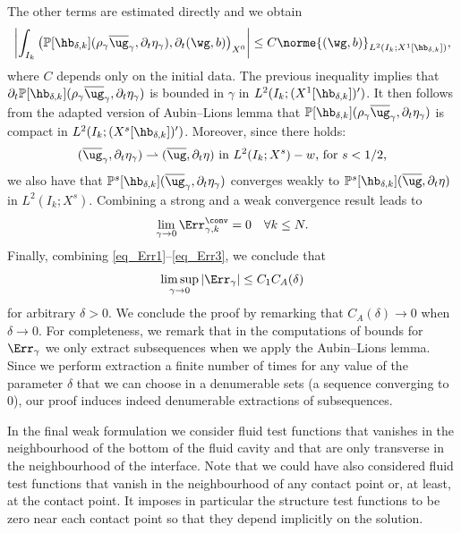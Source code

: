 The other terms are estimated directly and we obtain
\[
\left\vert \int_{I_{k}}\left( \mathbb{P}[\hb_{\delta, k}](\rho_{\gamma}\overline{\ug}_{\gamma},\partial_{t}\eta_{\gamma}), \partial_{t}(\wg,b) \right)_{X^0}\right\vert \leq C\norme{(\wg,b)}_{L^{2}(I_{k};X^{1}[\hb_{\delta, k}])},
\]
where $C$ depends only on the initial data.
The previous inequality implies that $\partial_{t}\mathbb{P}[\hb_{\delta, k}](\rho_{\gamma}\overline{\ug}_{\gamma},\partial_{t}\eta_{\gamma})$ is bounded in $\gamma$ in $L^{2}(I_{k};(X^{1}[\hb_{\delta, k}])')$. It then follows from the adapted version of Aubin--Lions lemma that $\mathbb{P}[\hb_{\delta, k}](\rho_{\gamma}\overline{\ug}_{\gamma},\partial_{t}\eta_{\gamma})$ is compact in $L^{2}(I_{k};(X^{s}[\hb_{\delta, k}])')$. Moreover, since there holds:
\[
(\overline{\ug}_{\gamma},\partial_t \eta_{\gamma}) \rightharpoonup (\overline{\ug},\partial_t \eta) \text{ in $L^2(I_k; X^s)-w$, for $s<1/2$,}
\]
we also have that
$\mathbb P^s[\hb_{\delta,k}](\overline{\ug}_{\gamma},\partial_t \eta_{\gamma})$ converges weakly to $\mathbb P^s[\hb_{\delta,k}](\overline{\ug},\partial_t \eta)$ in $L^2(I_k;X^s)$. Combining a strong and a weak convergence result leads to
\begin{equation} \label{eq_Err3}
\lim_{\gamma \to 0} \Err_{\gamma,k}^{\conv} = 0 \quad \forall k \leq N.
\end{equation}
Finally, combining \eqref{eq_Err1}--\eqref{eq_Err3}, we conclude that
\[
\limsup_{\gamma \to 0} |\Err_{\gamma} | \leq C_1C_A(\delta)
\]
for arbitrary $\delta >0$. We conclude the proof by remarking that $C_A(\delta) \to 0$ when $\delta \to 0$. For completeness, we remark that in the computations of bounds for $\Err_{\gamma}$ we only extract subsequences when we apply the Aubin--Lions lemma. Since we perform extraction a finite number of times for any value of the parameter $\delta$ that we can choose in a denumerable sets (\ie a sequence converging to $0$), our proof induces indeed denumerable extractions of subsequences.

\begin{remark} \label{rem:testfunction}
In the final weak formulation we consider fluid test functions that vanishes in the neighbourhood of the bottom of the fluid cavity and that are only transverse in the neighbourhood of the interface. Note that we could have also considered fluid test functions that vanish in the neighbourhood of any contact point or, at least, at the contact point. It imposes in particular the structure test functions to be zero near each contact point so that they depend implicitly on the solution.
\end{remark}

